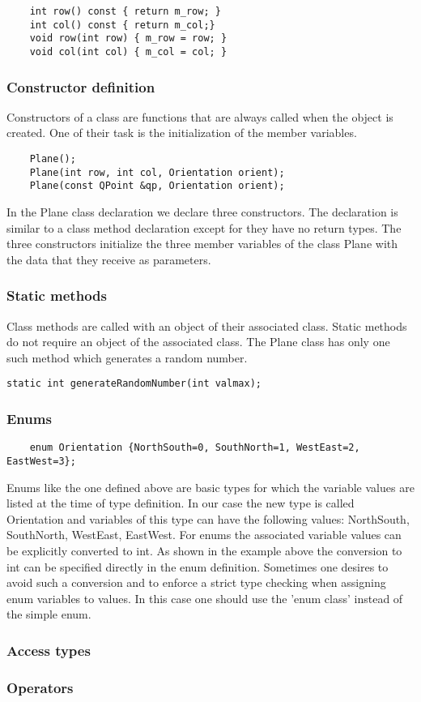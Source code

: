 \documentclass{article}
\begin{document}
\begin{lstlisting}
    int row() const { return m_row; }
    int col() const { return m_col;}
    void row(int row) { m_row = row; }
    void col(int col) { m_col = col; }
\end{lstlisting}

\subsubsection {Constructor definition}
Constructors of a class are functions that are always called when the object is created. One of their task is the initialization of the member variables.

\begin{lstlisting}
    Plane();
    Plane(int row, int col, Orientation orient);
    Plane(const QPoint &qp, Orientation orient);
\end{lstlisting}

In the Plane class declaration we declare three constructors. The declaration is similar to a class method declaration except for they have no return types. The three constructors initialize the three member variables of the class Plane with the data that they receive as parameters. 

\subsubsection {Static methods}

Class methods are called with an object of their associated class. Static methods do not require an object of the associated class. The Plane class has only one such method which generates a random number.

\begin{lstlisting}
static int generateRandomNumber(int valmax);
\end{lstlisting}

\subsubsection {Enums}
\begin{lstlisting}
    enum Orientation {NorthSouth=0, SouthNorth=1, WestEast=2, EastWest=3};
\end{lstlisting}

Enums like the one defined above are basic types for which the variable values are listed at the time of type definition. In our case the new type is called Orientation and variables of this type can have the following values: NorthSouth, SouthNorth, WestEast, EastWest. For enums the associated variable values can be explicitly converted to int. As shown in the example above the conversion to int can be specified directly in the enum definition. Sometimes one desires to avoid such a conversion and to enforce a strict type checking when assigning enum variables to values. In this case one should use the 'enum class' instead of the simple enum.  

\subsubsection {Access types}
\subsubsection {Operators}
\end{document}
